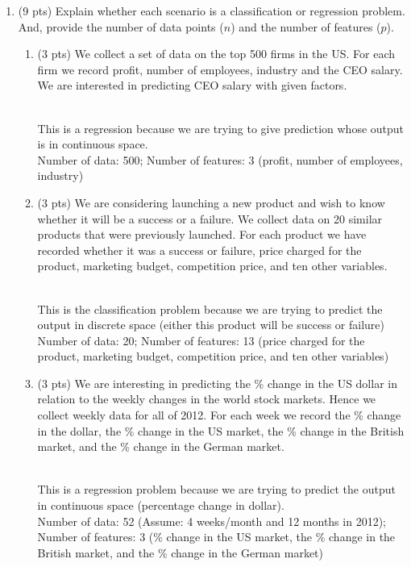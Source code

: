 \documentclass[a4paper]{article}
\theoremstyle{definition}
\newenvironment{soln}{
    \leavevmode\color{blue}\ignorespaces
}{}
\begin{document}
\begin{enumerate}
\item (9 pts) Explain whether each scenario is a classification or regression problem. And, provide the number of data points ($n$) and the number of features ($p$).

\begin{enumerate}
	\item (3 pts) We collect a set of data on the top 500 firms in the US. For each firm we record profit, number of employees, industry and the CEO salary. We are interested in predicting CEO salary with given factors.
	
	\begin{soln} \\
	This is a regression because we are trying to give prediction whose output is in continuous space. \\
	Number of data: 500; Number of features: 3 (profit, number of employees, industry) \end{soln}
	
	\item (3 pts) We are considering launching a new product and wish to know whether it will be a success or a failure. We collect data on 20 similar products that were previously launched. For each product we have recorded whether it was a success or failure, price charged for the product, marketing budget, competition price, and ten other variables.
	
	\begin{soln}\\
	This is the classification problem because we are trying to predict the output in discrete space (either this product will be success or failure)\\
	Number of data: 20; Number of features: 13 (price charged for the product, marketing budget, competition price, and ten other variables)
	\end{soln}
	
	\item (3 pts) We are interesting in predicting the \% change in the US dollar in relation to the weekly changes in the world stock markets. Hence we collect weekly data for all of 2012. For each week we record the \% change in the dollar, the \% change in the US market, the \% change in the British market, and the \% change in the German market.
	
	\begin{soln}\\
	This is a regression problem because we are trying to predict the output in continuous space (percentage change in dollar).\\
	Number of data: 52 (Assume: 4 weeks/month and 12 months in 2012); Number of features: 3 (\% change in the US market, the \% change in the British market, and the \% change in the German market)
	\end{soln}
	

\end{enumerate}
\end{enumerate}
\end{document}
